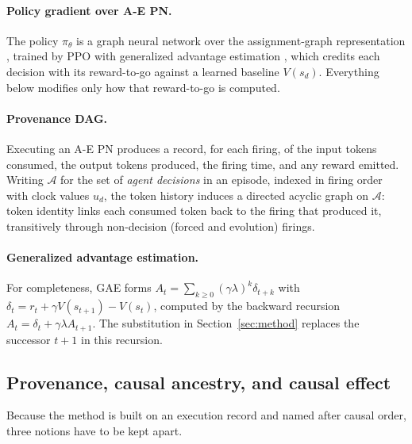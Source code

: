 \documentclass[review,authoryear,3p,times]{elsarticle}
\newcommand{\Ascr}{\mathcal{A}}
\begin{document}
\paragraph{Policy gradient over A-E PN.} The policy $\pi_\theta$ is a graph
neural network over the assignment-graph representation \citep{aepn_repr2025},
trained by PPO \citep{ppo2017} with generalized advantage estimation
\citep{gae2016}, which credits each decision with its reward-to-go against a
learned baseline $V(s_d)$. Everything below modifies only how that reward-to-go
is computed.

\paragraph{Provenance DAG.}
Executing an A-E PN produces a record, for each firing, of the input tokens
consumed, the output tokens produced, the firing time, and any reward emitted.
Writing $\Ascr$ for the set of \emph{agent decisions} in an episode, indexed in
firing order with clock values $u_d$, the token history induces a directed
acyclic graph on $\Ascr$: token identity links each consumed token back to the
firing that produced it, transitively through non-decision (forced and
evolution) firings.

\paragraph{Generalized advantage estimation.}
For completeness, GAE forms
$A_t = \sum_{k\ge 0}(\gamma\lambda)^k \delta_{t+k}$ with
$\delta_t = r_t + \gamma V(s_{t+1}) - V(s_t)$, computed by the backward
recursion $A_t = \delta_t + \gamma\lambda A_{t+1}$. The substitution in
Section~\ref{sec:method} replaces the successor $t+1$ in this recursion.

\subsection{Provenance, causal ancestry, and causal effect}
\label{sec:terms}

Because the method is built on an execution record and named after causal order,
three notions have to be kept apart.
\end{document}
